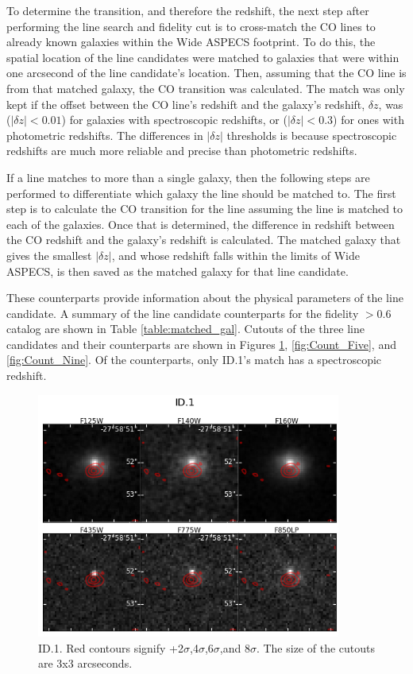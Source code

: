 To determine the transition, and therefore the redshift, the next step after performing the line search and fidelity cut is to cross-match the CO lines to already known galaxies within the Wide ASPECS footprint. To do this, the spatial location of the line candidates were matched to galaxies that were within one arcsecond of the line candidate's location. Then, assuming that the CO line is from that matched galaxy, the CO transition was calculated. The match was only kept if the offset between the CO line's redshift and the galaxy's redshift, $\delta z$, was ($|\delta z| < 0.01$) for galaxies with spectroscopic redshifts, or ($|\delta z| < 0.3$) for ones with photometric redshifts. The differences in $|\delta z|$ thresholds is because spectroscopic redshifts are much more reliable and precise than photometric redshifts. 

If a line matches to more than a single galaxy, then the following steps are performed to differentiate which galaxy the line should be matched to. The first step is to calculate the CO transition for the line assuming the line is matched to each of the galaxies. Once that is determined, the difference in redshift between the CO redshift and the galaxy's redshift is calculated. The matched galaxy that gives the smallest $|\delta z|$, and whose redshift falls within the limits of Wide ASPECS, is then saved as the matched galaxy for that line candidate. 

These counterparts provide information about the physical parameters of the line candidate. A summary of the line candidate counterparts for the fidelity $>$0.6 catalog are shown in Table \ref{table:matched_gal}. Cutouts of the three line candidates and their counterparts are shown in Figures \ref{fig:Count_One}, \ref{fig:Count_Five}, and \ref{fig:Count_Nine}. Of the counterparts, only ID.1's match has a spectroscopic redshift.

\begin{figure}[!htbp]
\centering \includegraphics[width=100mm]{Matched/ASPECS_Cutout_0.jpg}
\caption{ID.1. Red contours signify +2$\sigma$,4$\sigma$,6$\sigma$,and 8$\sigma$. The size of the cutouts are 3x3 arcseconds.}
\label{fig:Count_One}
\end{figure}

